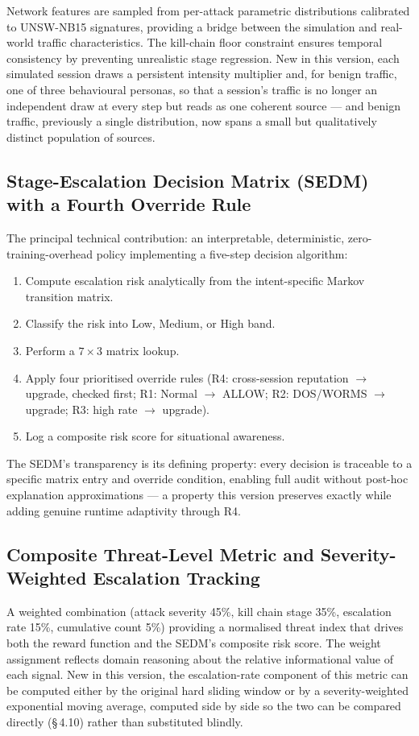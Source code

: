 Network features are sampled from per-attack parametric distributions
calibrated to UNSW-NB15 signatures, providing a bridge between the simulation
and real-world traffic characteristics.
The kill-chain floor constraint ensures temporal consistency by preventing
unrealistic stage regression.
New in this version, each simulated session draws a persistent intensity
multiplier and, for benign traffic, one of three behavioural personas, so
that a session's traffic is no longer an independent draw at every step but
reads as one coherent source --- and benign traffic, previously a single
distribution, now spans a small but qualitatively distinct population of
sources.

\subsection{Stage-Escalation Decision Matrix (SEDM) with a Fourth Override Rule}

The principal technical contribution: an interpretable, deterministic, zero-
training-overhead policy implementing a five-step decision algorithm:
%
\begin{enumerate}
  \item Compute escalation risk analytically from the intent-specific Markov
        transition matrix.
  \item Classify the risk into Low, Medium, or High band.
  \item Perform a $7 \times 3$ matrix lookup.
  \item Apply four prioritised override rules (R4: cross-session reputation
        $\to$ upgrade, checked first; R1: Normal $\to$ ALLOW; R2: DOS/WORMS
        $\to$ upgrade; R3: high rate $\to$ upgrade).
  \item Log a composite risk score for situational awareness.
\end{enumerate}

The SEDM's transparency is its defining property: every decision is traceable
to a specific matrix entry and override condition, enabling full audit without
post-hoc explanation approximations --- a property this version preserves
exactly while adding genuine runtime adaptivity through R4.

\subsection{Composite Threat-Level Metric and Severity-Weighted Escalation Tracking}

A weighted combination (attack severity 45\%, kill chain stage 35\%,
escalation rate 15\%, cumulative count 5\%) providing a normalised threat
index that drives both the reward function and the SEDM's composite risk score.
The weight assignment reflects domain reasoning about the relative informational
value of each signal.
New in this version, the escalation-rate component of this metric can be
computed either by the original hard sliding window or by a severity-weighted
exponential moving average, computed side by side so the two can be compared
directly (\S\,4.10) rather than substituted blindly.

